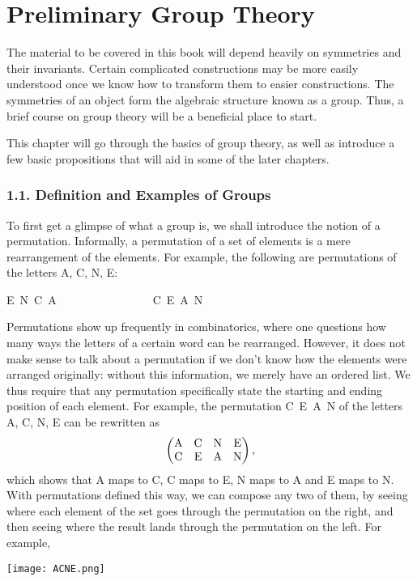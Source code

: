 \documentclass[leqno]{book}
\begin{document}
\chapter{Preliminary Group Theory}

The material to be covered in this book will depend heavily on symmetries and their invariants.  Certain complicated constructions may be more easily understood once we know how to transform them to easier constructions.  The symmetries of an object form the algebraic structure known as a group.  Thus, a brief course on group theory will be a beneficial place to start.

This chapter will go through the basics of group theory, as well as introduce a few basic propositions that will aid in some of the later chapters.

\subsection*{1.1. Definition and Examples of Groups}
To first get a glimpse of what a group is, we shall introduce the notion of a permutation.  Informally, a permutation of a set of elements is a mere rearrangement of the elements.  For example, the following are permutations of the letters A, C, N, E:
\begin{center}
E~N~C~A~~~~~~~~~~~~~~~~~C~E~A~N
\end{center}
Permutations show up frequently in combinatorics, where one questions how many ways the letters of a certain word can be rearranged.  However, it does not make sense to talk about a permutation if we don't know how the elements were arranged originally: without this information, we merely have an ordered list.  We thus require that any permutation specifically state the starting and ending position of each element.  For example, the permutation C~E~A~N of the letters A, C, N, E can be rewritten as
$$\begin{pmatrix}\text A&\text C&\text N&\text E\\\text C&\text E&\text A&\text N\end{pmatrix},$$
which shows that A maps to C, C maps to E, N maps to A and E maps to N.  With permutations defined this way, we can compose any two of them, by seeing where each element of the set goes through the permutation on the right, and then seeing where the result lands through the permutation on the left.  For example,
\begin{center}\texttt{[image: ACNE.png]}\end{center}
\end{document}

